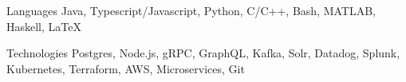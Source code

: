 

\begin{cvskills}

  \cvskill
    {Languages} %
    {Java, Typescript/Javascript, Python, C/C++, Bash, MATLAB, Haskell, LaTeX} %

  \cvskill
    {Technologies} %
    {Postgres, Node.js, gRPC, GraphQL, Kafka, Solr, Datadog, Splunk, Kubernetes, Terraform, AWS, Microservices, Git} %

\end{cvskills}
